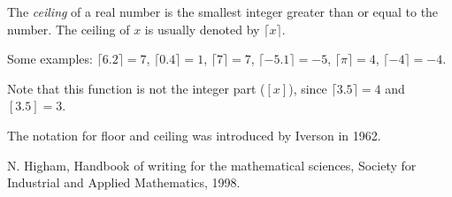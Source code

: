 \documentclass[12pt]{article}
\begin{document}
The \emph{ceiling} of a real number is the smallest integer greater than or equal to the number. The ceiling of $x$ is usually denoted by $\lceil x\rceil$.

Some examples:
$\lceil 6.2\rceil=7$, $\lceil 0.4\rceil=1$, $\lceil 7\rceil=7$, $\lceil -5.1\rceil=-5$, $\lceil \pi\rceil=4$, $\lceil -4\rceil=-4$.

Note that this function is not the integer part ($[x]$), since 
$\lceil 3.5\rceil = 4$ and $[3.5]=3$.

The notation for floor and ceiling was introduced by Iverson in 1962\cite{Higham}.
 
\begin{thebibliography}{9}
 N. Higham, Handbook of writing for the mathematical sciences, Society for Industrial and Applied Mathematics, 1998.
\end{thebibliography}
\end{document}
